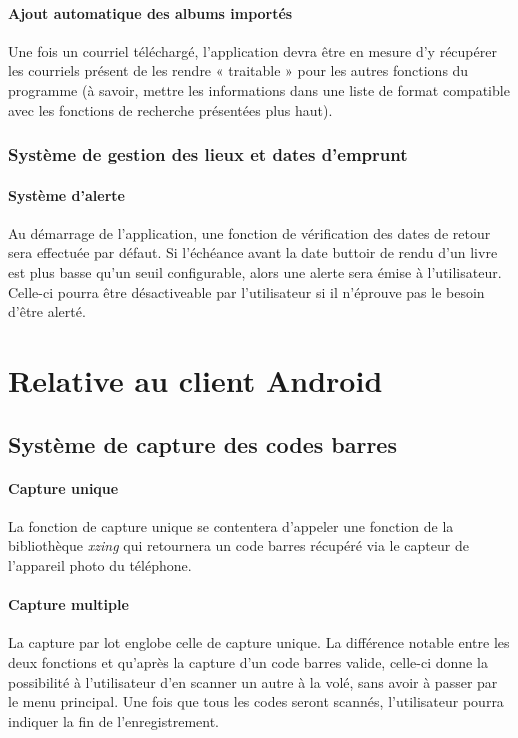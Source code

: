 \paragraph{Ajout automatique des albums importés}
Une fois un courriel téléchargé, l'application devra être en mesure d'y récupérer les courriels présent de les rendre « traitable » pour les autres fonctions du programme 
(à savoir, mettre les informations dans une liste de format compatible avec les fonctions de recherche présentées plus haut).  

\subsubsection{Système de gestion des lieux et dates d'emprunt}

\paragraph{Système d'alerte}
Au démarrage de l'application, une fonction de vérification des dates de retour sera effectuée par défaut. 
Si l'échéance avant la date buttoir de rendu d'un livre est plus basse qu'un seuil configurable, 
	alors une alerte sera émise à l'utilisateur. 
Celle-ci pourra être désactiveable par l'utilisateur si il n'éprouve pas le besoin d'être alerté. 

\section{Relative au client Android}

\subsection{Système de capture des codes barres}

\paragraph{Capture unique}
La fonction de capture unique se contentera d'appeler une fonction de la bibliothèque \emph{xzing} qui retournera un code barres récupéré via le capteur de l'appareil photo du téléphone.

\paragraph{Capture multiple}
La capture par lot englobe celle de capture unique.
La différence notable entre les deux fonctions et qu'après la capture d'un code barres valide, celle-ci donne la possibilité à l'utilisateur d'en scanner un autre à la volé,
	sans avoir à passer par le menu principal. 
Une fois que tous les codes seront scannés, l'utilisateur pourra indiquer la fin de l'enregistrement. 

